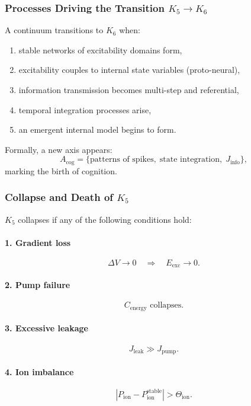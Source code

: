 \subsubsection{Processes Driving the Transition \texorpdfstring{$K_5 \to K_6$}{K_5 \to K_6}}

A continuum transitions to $K_6$ when:
\begin{enumerate}
    \item stable networks of excitability domains form,
    \item excitability couples to internal state variables (proto-neural),
    \item information transmission becomes multi-step and referential,
    \item temporal integration processes arise,
    \item an emergent internal model begins to form.
\end{enumerate}

Formally, a new axis appears:
\[
A_{\text{cog}} = \{\text{patterns of spikes},\; 
\text{state integration},\; J_{\text{info}}\},
\]
marking the birth of cognition.

\subsubsection{Collapse and Death of \texorpdfstring{$K_5$}{K_5}}

$K_5$ collapses if any of the following conditions hold:

\paragraph{1. Gradient loss}
\[
\Delta V \to 0 \quad\Rightarrow\quad E_{\text{exc}} \to 0.
\]

\paragraph{2. Pump failure}
\[
C_{\text{energy}} \text{ collapses}.
\]

\paragraph{3. Excessive leakage}
\[
J_{\text{leak}} \gg J_{\text{pump}}.
\]

\paragraph{4. Ion imbalance}
\[
|P_{\text{ion}} - P_{\text{ion}}^{\text{stable}}| > \Theta_{\text{ion}}.
\]

